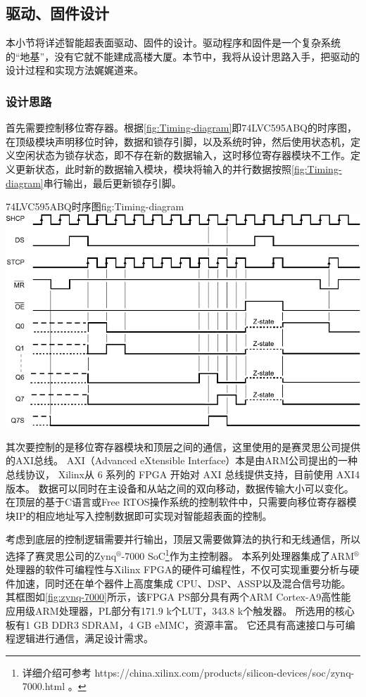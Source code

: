 \documentclass[supercite]{HustGraduPaper}
\begin{document}
\subsection{驱动、固件设计}

本小节将详述智能超表面驱动、固件的设计。驱动程序和固件是一个复杂系统的“地基”，没有它就不能建成高楼大厦。本节中，我将从设计思路入手，把驱动的设计过程和实现方法娓娓道来。

\subsubsection{设计思路}

首先需要控制移位寄存器。根据\autoref{fig:Timing-diagram}即74LVC595ABQ的时序图，在顶级模块声明移位时钟，数据和锁存引脚，以及系统时钟，然后使用状态机，定义空闲状态为锁存状态，即不存在新的数据输入，这时移位寄存器模块不工作。定义更新状态，此时新的数据输入模块，模块将输入的并行数据按照\autoref{fig:Timing-diagram}串行输出，最后更新锁存引脚。

\begin{generalfig}[htb]{74LVC595ABQ时序图}{fig:Timing-diagram}
	\includegraphics[width=0.8\linewidth]{Figures/Timing-diagram.pdf}
\end{generalfig}

其次要控制的是移位寄存器模块和顶层之间的通信，这里使用的是赛灵思公司提供的AXI总线。
AXI（Advanced eXtensible Interface）本是由ARM公司提出的一种总线协议， Xilinx从 6 系列的 FPGA 开始对 AXI 总线提供支持，目前使用 AXI4 版本。
数据可以同时在主设备和从站之间的双向移动，数据传输大小可以变化。
在顶层的基于C语言或Free RTOS操作系统的控制软件中，只需要向移位寄存器模块IP的相应地址写入控制数据即可实现对智能超表面的控制。

考虑到底层的控制逻辑需要并行输出，顶层又需要做算法的执行和无线通信，所以选择了赛灵思公司的Zynq$^\circledR$-7000 SoC\footnote{详细介绍可参考 https://china.xilinx.com/products/silicon-devices/soc/zynq-7000.html 。}作为主控制器。
本系列处理器集成了ARM$^\circledR$处理器的软件可编程性与Xilinx FPGA的硬件可编程性，不仅可实现重要分析与硬件加速，同时还在单个器件上高度集成 CPU、DSP、ASSP以及混合信号功能。
其框图如\autoref{fig:zynq-7000}所示，该FPGA PS部分具有两个ARM Cortex-A9高性能应用级ARM处理器，PL部分有171.9 k个LUT，343.8 k个触发器。
所选用的核心板有1 GB DDR3 SDRAM，4 GB eMMC，资源丰富。
它还具有高速接口与可编程逻辑进行通信，满足设计需求。
\end{document}
